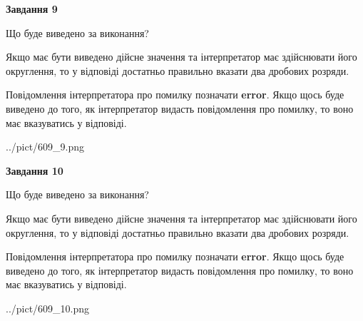 \documentclass[12pt, ukrainian]{article}
\begin{document}
{\begin {Large}
{\begin {center}\textbf{Завдання 9}\end {center}}\par
Що буде виведено за виконання? \par

Якщо має бути виведено дійсне значення та інтерпретатор має здійснювати його округлення, 
то у відповіді достатньо правильно вказати два дробових розряди.

Повідомлення інтерпретатора про помилку позначати \textbf{error}.
Якщо щось буде виведено до того, як інтерпретатор видасть повідомлення про помилку, 
то воно має вказуватись у відповіді. \par

\begin{center}
	{../pict/609_9.png}
\end{center}
\newpage

{\begin {center}\textbf{Завдання 10}\end {center}}\par
Що буде виведено за виконання? \par

Якщо має бути виведено дійсне значення та інтерпретатор має здійснювати його округлення, 
то у відповіді достатньо правильно вказати два дробових розряди.

Повідомлення інтерпретатора про помилку позначати \textbf{error}.
Якщо щось буде виведено до того, як інтерпретатор видасть повідомлення про помилку, 
то воно має вказуватись у відповіді. \par

\begin{center}
	{../pict/609_10.png}
\end{center}
\newpage

\end {Large}}
\end{document}

